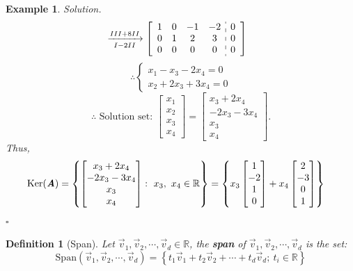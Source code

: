 \documentclass[12pt, a4paper]{article}
\newtheorem{df}{Definition}[subsection]
\newtheorem{eg}{Example}[subsection]
\newenvironment*{sol}{\indent\textit{Solution. }}{\hfill{$\square$}\par}
\def\R{{\mathbb{R}}}
\def\Span{\mathrm{Span}}
\def\Ker{\mathrm{Ker}}
\def\vecv{\vec{v}}
\def\matrixA{\textbf{\emph{A}}}
\begin{document}
\begin{eg}
\begin{sol}
$$\begin{aligned}
			&\xrightarrow[I-2II]{III+8II}\left[\begin{array}{c:c}\begin{matrix}1&0&-1&-2\\0&1&2&3\\0&0&0&0\end{matrix}&\begin{matrix}0\\0\\0\end{matrix}\end{array}\right]
		\end{aligned}$$
		\[\therefore\begin{cases}x_1-x_3-2x_4=0\\x_2+2x_3+3x_4=0\end{cases}\]
		$$\therefore\text{ Solution set: }\begin{bmatrix}x_1\\x_2\\x_3\\x_4\end{bmatrix}=\begin{bmatrix}x_3+2x_4\\-2x_3-3x_4\\x_3\\x_4\end{bmatrix}.$$
		Thus, $$\begin{aligned}\Ker(\matrixA)&=\left\{\begin{bmatrix}x_3+2x_4\\-2x_3-3x_4\\x_3\\x_4\end{bmatrix}:\ x_3,\ x_4\in\R\right\}=\left\{x_3\begin{bmatrix}1\\-2\\1\\0\end{bmatrix}+x_4\begin{bmatrix}2\\-3\\0\\1\end{bmatrix}\right\}\end{aligned}$$
	\end{sol}
\end{eg}
\begin{df}[Span]
	Let $\vecv_1,\vecv_2,\cdots,\vecv_d\in\R$, the \textbf{span} of $\vecv_1,\vecv_2,\cdots,\vecv_d$ is the set: 
	\[\Span(\vecv_1,\vecv_2,\cdots,\vecv_d)=\left\{t_1\vecv_1+t_2\vecv_2+\cdots+t_d\vecv_d;\  t_i\in\R\right\}\]
\end{df}
\end{document}
